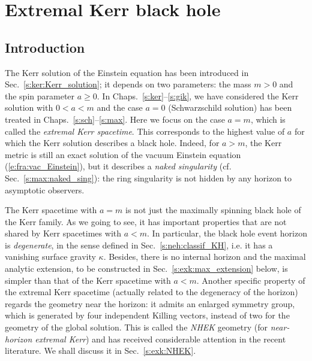 \chapter{Extremal Kerr black hole}
\label{s:exk}

\minitoc

\section{Introduction}

The Kerr solution of the Einstein equation has been introduced in Sec.~\ref{s:ker:Kerr_solution};
it depends on two parameters: the mass $m > 0$ and the spin parameter
$a \geq 0$.
In Chaps.~\ref{s:ker}--\ref{s:gik}, we have considered the Kerr solution with $0<a<m$
and the case $a=0$ (Schwarzschild solution) has been treated in Chaps.~\ref{s:sch}--\ref{s:max}.
Here we focus on the case $a=m$, which is called the \emph{extremal Kerr spacetime}.
This corresponds to the highest value of $a$
for which the Kerr solution describes a black hole.
Indeed, for $a> m$, the Kerr metric is still an exact
solution of the vacuum Einstein equation (\ref{e:fra:vac_Einstein}), but it describes a \emph{naked singularity} (cf. Sec.~\ref{s:max:naked_sing}):
the ring singularity is not hidden by any horizon to asymptotic observers.

The Kerr spacetime with $a=m$ is not just the maximally spinning black hole of the Kerr family.
As we going to see, it has important properties that are not
shared by Kerr spacetimes with $a<m$. In particular, the black hole event horizon is
\emph{degenerate}, in the sense defined in Sec.~\ref{s:neh:classif_KH}, i.e. it has a
vanishing surface gravity $\kappa$. Besides, there is no internal horizon
and the maximal analytic extension, to be constructed in Sec.~\ref{s:exk:max_extension}
below, is simpler than
that of the Kerr spacetime with $a<m$.
Another specific property of the extremal Kerr spacetime (actually related
to the degeneracy of the horizon)
regards the geometry near the horizon: it admits an enlarged
symmetry group, which is generated
by four independent Killing vectors,
instead of two for the geometry of the global solution.
This is called the \emph{NHEK} geometry (for \emph{near-horizon extremal Kerr})
and has received considerable attention in the recent literature. We shall
discuss it in Sec.~\ref{s:exk:NHEK}.



